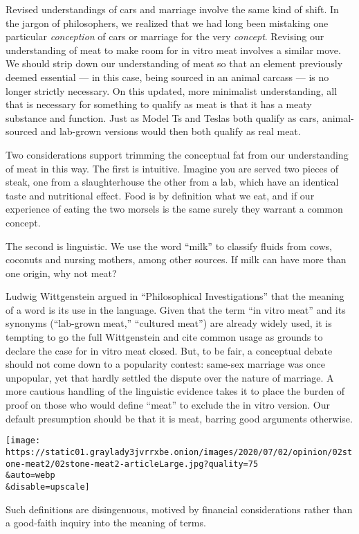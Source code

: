 Revised understandings of cars and marriage involve the same kind of
shift. In the jargon of philosophers, we realized that we had long been
mistaking one particular \emph{conception} of cars or marriage for the
very \emph{concept}. Revising our understanding of meat to make room for
in vitro meat involves a similar move. We should strip down our
understanding of meat so that an element previously deemed essential ---
in this case, being sourced in an animal carcass --- is no longer
strictly necessary. On this updated, more minimalist understanding, all
that is necessary for something to qualify as meat is that it has a
meaty substance and function. Just as Model Ts and Teslas both qualify
as cars, animal-sourced and lab-grown versions would then both qualify
as real meat.

Two considerations support trimming the conceptual fat from our
understanding of meat in this way. The first is intuitive. Imagine you
are served two pieces of steak, one from a slaughterhouse the other from
a lab, which have an identical taste and nutritional effect. Food is by
definition what we eat, and if our experience of eating the two morsels
is the same surely they warrant a common concept.

The second is linguistic. We use the word ``milk'' to classify fluids
from cows, coconuts and nursing mothers, among other sources. If milk
can have more than one origin, why not meat?

Ludwig Wittgenstein argued in ``Philosophical Investigations'' that the
meaning of a word is its use in the language. Given that the term ``in
vitro meat'' and its synonyms (``lab-grown meat,'' ``cultured meat'')
are already widely used, it is tempting to go the full Wittgenstein and
cite common usage as grounds to declare the case for in vitro meat
closed. But, to be fair, a conceptual debate should not come down to a
popularity contest: same-sex marriage was once unpopular, yet that
hardly settled the dispute over the nature of marriage. A more cautious
handling of the linguistic evidence takes it to place the burden of
proof on those who would define ``meat'' to exclude the in vitro
version. Our default presumption should be that it is meat, barring good
arguments otherwise.

\texttt{[image: https://static01.graylady3jvrrxbe.onion/images/2020/07/02/opinion/02stone-meat2/02stone-meat2-articleLarge.jpg?quality=75\\\&auto=webp\\\&disable=upscale]}

Such definitions are disingenuous, motived by financial considerations
rather than a good-faith inquiry into the meaning of terms.

